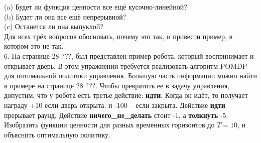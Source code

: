 \documentclass[10pt,a4paper]{article}
\begin{document}
(a)	Будет ли функция ценности все ещё кусочно-линейной?\\

(b)	Будет ли она все ещё непрерывной?\\

(c)	Останется ли она выпуклой?\\

Для всех трёх вопросов обосновать, почему это так, и привести пример, в котором это не так.\\

6.	На странице 28 ???, был представлен пример робота, который воспринимает и открывает дверь. В этом упражнении требуется реализовать алгоритм POMDP для оптимальной политики управления. Большую часть информации можно найти в примере на странице 28 ???. Чтобы превратить ее в задачу управления, допустим, что у робота есть третье действие: \textbf{идти}. Когда он идёт, то получает награду +10 если дверь открыта, и -100 – если закрыта. Действие \textbf{идти} прерывает раунд. Действие \textbf{ничего\_не\_делать} стоит -1, а \textbf{толкнуть} -5. Изобразить функции ценности для разных временных горизонтов до $T = 10$, и объяснить оптимальную политику.\\




 
\end{document}
